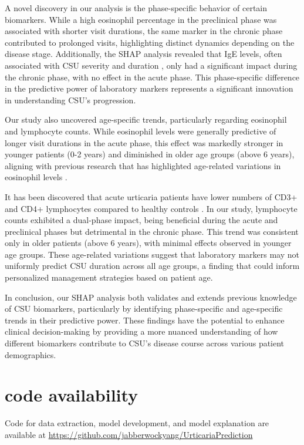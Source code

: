 \documentclass[final,3p,times,authoryear]{elsarticle}
\begin{document}
A novel discovery in our analysis is the phase-specific behavior of certain biomarkers. While a high eosinophil percentage in the preclinical phase was associated with shorter visit durations, the same marker in the chronic phase contributed to prolonged visits, highlighting distinct dynamics depending on the disease stage. Additionally, the SHAP analysis revealed that IgE levels, often associated with CSU severity and duration \citep{SanchezBorges2017Factors}, only had a significant impact during the chronic phase, with no effect in the acute phase. This phase-specific difference in the predictive power of laboratory markers represents a significant innovation in understanding CSU's progression.

Our study also uncovered age-specific trends, particularly regarding eosinophil and lymphocyte counts. While eosinophil levels were generally predictive of longer visit durations in the acute phase, this effect was markedly stronger in younger patients (0-2 years) and diminished in older age groups (above 6 years), aligning with previous research that has highlighted age-related variations in eosinophil levels \citep{A2023Serum}.

It has been discovered that acute urticaria patients have lower numbers of CD3+ and CD4+ lymphocytes compared to healthy controls \citep{De-yu2009Determination}. In our study, lymphocyte counts exhibited a dual-phase impact, being beneficial during the acute and preclinical phases but detrimental in the chronic phase. This trend was consistent only in older patients (above 6 years), with minimal effects observed in younger age groups. These age-related variations suggest that laboratory markers may not uniformly predict CSU duration across all age groups, a finding that could inform personalized management strategies based on patient age.


In conclusion, our SHAP analysis both validates and extends previous knowledge of CSU biomarkers, particularly by identifying phase-specific and age-specific trends in their predictive power. These findings have the potential to enhance clinical decision-making by providing a more nuanced understanding of how different biomarkers contribute to CSU's disease course across various patient demographics.





\section{code availability}\label{code}
Code for data extraction, model development, and model explanation are available at \url{https://github.com/jabberwockyang/UrticariaPrediction}
\end{document}
